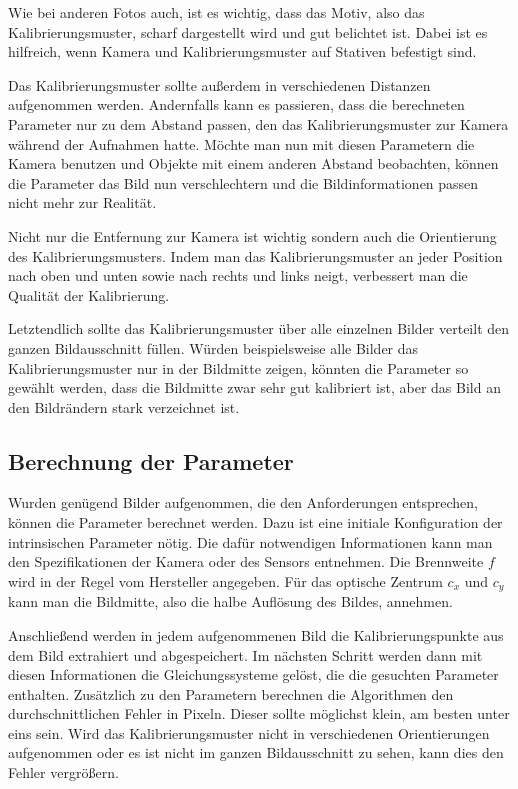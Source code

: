 Wie bei anderen Fotos auch, ist es wichtig, dass das Motiv, also das Kalibrierungsmuster, scharf dargestellt wird und gut belichtet ist. Dabei ist es hilfreich, wenn Kamera und Kalibrierungsmuster auf Stativen befestigt sind. 

Das Kalibrierungsmuster sollte außerdem in verschiedenen Distanzen aufgenommen werden. Andernfalls kann es passieren, dass die berechneten Parameter nur zu dem Abstand passen, den das Kalibrierungsmuster zur Kamera während der Aufnahmen hatte. Möchte man nun mit diesen Parametern die Kamera benutzen und Objekte mit einem anderen Abstand beobachten, können die Parameter das Bild nun verschlechtern und die Bildinformationen passen nicht mehr zur Realität.

Nicht nur die Entfernung zur Kamera ist wichtig sondern auch die Orientierung des Kalibrierungsmusters. Indem man das Kalibrierungsmuster an jeder Position nach oben und unten sowie nach rechts und links neigt, verbessert man die Qualität der Kalibrierung.

Letztendlich sollte das Kalibrierungsmuster über alle einzelnen Bilder verteilt den ganzen Bildausschnitt füllen. Würden beispielsweise alle Bilder das Kalibrierungsmuster nur in der Bildmitte zeigen, könnten die Parameter so gewählt werden, dass die Bildmitte zwar sehr gut kalibriert ist, aber das Bild an den Bildrändern stark verzeichnet ist. 

\subsection{Berechnung der Parameter} %
\label{sub:berechnung_der_parameter}
Wurden genügend Bilder aufgenommen, die den Anforderungen entsprechen, können die Parameter berechnet werden. Dazu ist eine initiale Konfiguration der intrinsischen Parameter nötig. Die dafür notwendigen Informationen kann man den Spezifikationen der Kamera oder des Sensors entnehmen. Die Brennweite $f$ wird in der Regel vom Hersteller angegeben. Für das optische Zentrum $c_x$ und $c_y$ kann man die Bildmitte, also die halbe Auflösung des Bildes, annehmen.

Anschließend werden in jedem aufgenommenen Bild die Kalibrierungspunkte aus dem Bild extrahiert und abgespeichert. Im nächsten Schritt werden dann mit diesen Informationen die Gleichungssysteme gelöst, die die gesuchten Parameter enthalten. Zusätzlich zu den Parametern berechnen die Algorithmen den durchschnittlichen Fehler in Pixeln. Dieser sollte möglichst klein, am besten unter eins sein. Wird das Kalibrierungsmuster nicht in verschiedenen Orientierungen aufgenommen oder es ist nicht im ganzen Bildausschnitt zu sehen, kann dies den Fehler vergrößern.

